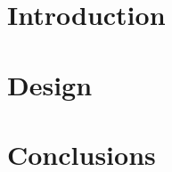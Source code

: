 \documentclass[10pt]{report}
\begin{document}

\restoregeometry

\setcounter{tocdepth}{5}
\tableofcontents
\listoffigures
\listoftables
\pagebreak

\justify

\chapter{Introduction}

\pagebreak

\chapter{Design}

\pagebreak

\chapter{Conclusions}

\pagebreak

\printbibliography
\end{document}
